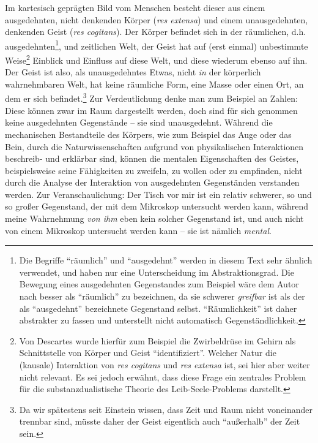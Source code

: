\documentclass[a4paper, 12pt]{article}
\begin{document}
\begin{onehalfspace}
\noindent Im kartesisch geprägten Bild vom Menschen besteht dieser aus einem ausgedehnten, nicht denkenden Körper (\emph{res extensa}) und einem unausgedehnten, denkenden Geist (\emph{res cogitans}). Der Körper befindet sich in der räumlichen, d.h. ausgedehnten\footnote{Die Begriffe "`räumlich"' und "`ausgedehnt"' werden in diesem Text sehr ähnlich verwendet, und haben nur eine Unterscheidung im Abstraktionsgrad. Die Bewegung eines ausgedehnten Gegenstandes zum Beispiel wäre dem Autor nach besser als "`räumlich"' zu bezeichnen, da sie schwerer \emph{greifbar} ist als der als "`ausgedehnt"' bezeichnete Gegenstand selbst. "`Räumlichkeit"' ist daher abstrakter zu fassen und unterstellt nicht automatisch Gegenständlichkeit.}, und zeitlichen Welt, der Geist hat auf (erst einmal) unbestimmte Weise\footnote{Von Descartes wurde hierfür zum Beispiel die Zwirbeldrüse im Gehirn als Schnittstelle von Körper und Geist "`identifiziert"'. Welcher Natur die (kausale) Interaktion von \emph{res cogitans} und \emph{res extensa} ist, sei hier aber weiter nicht relevant. Es sei jedoch erwähnt, dass diese Frage ein zentrales Problem für die substanzdualistische Theorie des Leib-Seele-Problems darstellt.} Einblick und Einfluss auf diese Welt, und diese wiederum ebenso auf ihn. Der Geist ist also, als unausgedehntes Etwas, nicht \emph{in} der körperlich wahrnehmbaren Welt, hat keine räumliche Form, eine Masse oder einen Ort, an dem er sich befindet.\footnote{Da wir spätestens seit Einstein wissen, dass Zeit und Raum nicht voneinander trennbar sind, müsste daher der Geist eigentlich auch "`außerhalb"' der Zeit sein.} Zur Verdeutlichung denke man zum Beispiel an Zahlen: Diese können zwar im Raum dargestellt werden, doch sind für sich genommen keine ausgedehnten Gegenstände -- sie sind unausgedehnt. Während die mechanischen Bestandteile des Körpers, wie zum Beispiel das Auge oder das Bein, durch die Naturwissenschaften aufgrund von physikalischen Interaktionen beschreib- und erklärbar sind, können die mentalen Eigenschaften des Geistes, beispielsweise seine Fähigkeiten zu zweifeln, zu wollen oder zu empfinden, nicht durch die Analyse der Interaktion von ausgedehnten Gegenständen verstanden werden. Zur Veranschaulichung: Der Tisch vor mir ist ein relativ schwerer, so und so großer Gegenstand, der mit dem Mikroskop untersucht werden kann, während meine Wahrnehmung \emph{von ihm} eben kein solcher Gegenstand ist, und auch nicht von einem Mikroskop untersucht werden kann -- sie ist nämlich \emph{mental}. 


\end{onehalfspace}
\end{document}
